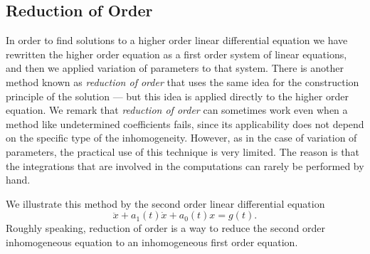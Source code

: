 \documentclass{ximera}
\begin{document}
\subsection*{Reduction of Order}

In order to find solutions to a higher order linear differential equation 
we have rewritten the higher order equation as a first order
system of linear equations, and then we applied variation of
parameters to that system.  There is another method known as
{\em reduction of order\/} that uses the same idea for the
construction principle of the solution --- but this idea is applied directly 
to the higher order equation.  We remark that {\em reduction of
order\/} can sometimes work even when a method like undetermined 
coefficients fails, since its applicability does not depend on the 
specific type of the inhomogeneity.  However, as in the case 
of variation of parameters, the practical use of this technique is very 
limited.  The reason is that the integrations that are involved in the 
computations can rarely be performed by hand.


We illustrate this method by the second order linear differential 
equation
\begin{equation}  \label{e:inhom2}
\ddot{x} + a_1(t)\dot{x} + a_0(t)x = g(t).
\end{equation}
Roughly speaking, reduction of order is a way to reduce the second order 
inhomogeneous equation to an inhomogeneous first order equation.
\end{document}
